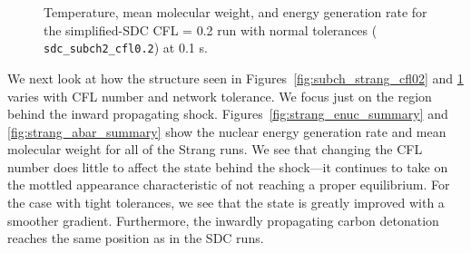 \documentclass[linenumbers,trackchanges]{aastex631}
\newcommand{\isot}[2]{$^{#2}\mathrm{#1}$}
\newcommand{\isotm}[2]{{}^{#2}\mathrm{#1}}
\newcommand{\MarginPar}[1]{\marginpar{\vskip-\baselineskip\raggedright\tiny\sffamily\hrule\smallskip{\color{red}#1}\par\smallskip\hrule}}
\begin{document}
\begin{figure}
\centering
{}
\caption{\label{fig:subch_sdc_cfl02} Temperature, mean molecular weight, and
energy generation rate for the simplified-SDC CFL = 0.2 run with normal tolerances ({\tt
sdc\_subch2\_cfl0.2}) at 0.1 s.}
\end{figure}





We next look at how the structure seen in
Figures~\ref{fig:subch_strang_cfl02} and \ref{fig:subch_sdc_cfl02}
varies with CFL number and network tolerance.  We focus just on the
region behind the inward propagating shock.
Figures~\ref{fig:strang_enuc_summary} and
\ref{fig:strang_abar_summary} show the nuclear energy generation rate
and mean molecular weight for all of the Strang runs.  We see that
changing the CFL number does little to affect the state behind the
shock---it continues to take on the mottled appearance characteristic
of not reaching a proper equilibrium.  For the case with tight tolerances, we
see that the state is greatly improved with a smoother gradient.  Furthermore, the inwardly
propagating carbon detonation reaches the same position as in the SDC runs.
\end{document}

